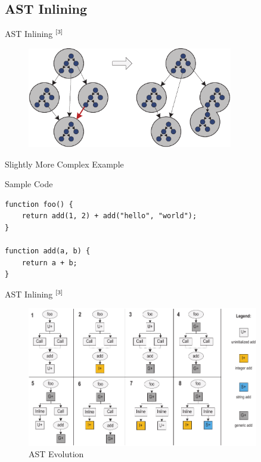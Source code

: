 \documentclass[xcolor=dvipsname,handout]{beamer}
\newcommand{\up}[1]{\ensuremath{^{{\tiny#1}}}}
\begin{document}
\subsection{AST Inlining}

\begin{frame}[fragile]{AST Inlining \up{[3]}}
  \begin{figure}
    \centering
    \includegraphics[width=0.8\textwidth]{image02-2.pdf}
    \label{fig:inlining}
  \end{figure}
\end{frame}

\begin{frame}[fragile]{Slightly More Complex Example}
    \begin{block}{Sample Code}
    \begin{lstlisting}
function foo() {
    return add(1, 2) + add("hello", "world");
}

function add(a, b) {
    return a + b;
}
    \end{lstlisting}
    \end{block}
\end{frame}

\begin{frame}[fragile]{AST Inlining \up{[3]}}
  \begin{figure}
    \centering
    \includegraphics[width=0.9\textwidth]{image01-2.pdf}
    \caption{AST Evolution}
    \label{fig:inlining2}
  \end{figure}
\end{frame}
\end{document}
